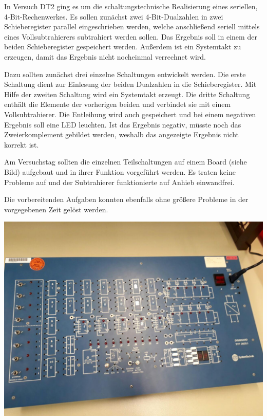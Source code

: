 In Versuch DT2 ging es um die schaltungstechnische Realisierung eines seriellen, 4-Bit-Rechenwerkes. Es sollen zunächst zwei 4-Bit-Dualzahlen in zwei Schieberegister parallel eingeschrieben werden, welche anschließend seriell mittels eines Vollsubtrahierers subtrahiert werden sollen. Das Ergebnis soll in einem der beiden Schieberegister gespeichert werden. Außerdem ist ein Systemtakt zu erzeugen, damit das Ergebnis nicht nocheinmal verrechnet wird.\par
Dazu sollten zunächst drei einzelne Schaltungen entwickelt werden. Die erste Schaltung dient zur Einlesung der beiden Dualzahlen in die Schieberegister. Mit Hilfe der zweiten Schaltung wird ein Systemtakt erzeugt. Die dritte Schaltung enthält die Elemente der vorherigen beiden und verbindet sie mit einem Vollsubtrahierer. Die Entleihung wird auch gespeichert und bei einem negativen Ergebnis soll eine LED leuchten. Ist das Ergebnis negativ, müsste noch das Zweierkomplement gebildet werden, weshalb das angezeigte Ergebnis nicht korrekt ist.\par
Am Versuchstag sollten die einzelnen Teilschaltungen auf einem Board (siehe Bild) aufgebaut und in ihrer Funktion vorgeführt werden. Es traten keine Probleme auf und der Subtrahierer funktionierte auf Anhieb einwandfrei.\par
Die vorbereitenden Aufgaben konnten ebenfalls ohne größere Probleme in der vorgegebenen Zeit gelöst werden.


\includegraphics[width=0.75\columnwidth]{DT2Graphics/Board.jpg}
